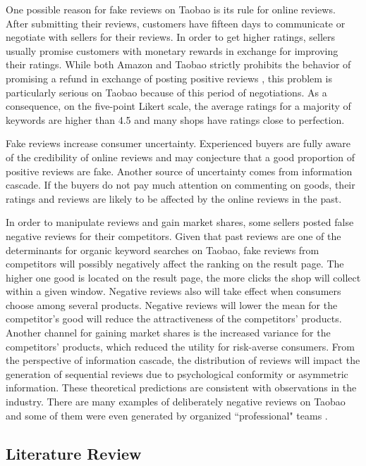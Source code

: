 ﻿\documentclass[a4paper,10pt]{article}
\begin{document}
One possible reason for fake reviews on Taobao is its rule for online reviews. After submitting their reviews, customers have fifteen days to communicate or negotiate with sellers for their reviews. In order to get higher ratings, sellers usually promise customers with monetary rewards in exchange for improving their ratings. While both Amazon and Taobao strictly prohibits the behavior of promising a refund in exchange of posting positive reviews \cite{taobao,amazon}, this problem is particularly serious on Taobao because of this period of negotiations. As a consequence, on the five-point Likert scale, the average ratings for a majority of keywords are higher than 4.5 and many shops have ratings close to perfection. 

Fake reviews increase consumer uncertainty. Experienced buyers are fully aware of the credibility of online reviews and may conjecture that a good proportion of positive reviews are fake. Another source of uncertainty comes from information cascade. If the buyers do not pay much attention on commenting on goods, their ratings and reviews are likely to be affected by the online reviews in the past. 

In order to manipulate reviews and gain market shares, some sellers posted false negative reviews for their competitors. Given that past reviews are one of the determinants for organic keyword searches on Taobao, fake reviews from competitors will possibly negatively affect the ranking on the result page. The higher one good is located on the result page, the more clicks the shop will collect within a given window. Negative reviews also will take effect when consumers choose among several products. Negative reviews will lower the mean for the competitor's good will reduce the attractiveness of the competitors' products. Another channel for gaining market shares is the increased variance for the competitors' products, which reduced the utility for risk-averse consumers. From the perspective of information cascade, the distribution of reviews will impact the generation of sequential reviews due to psychological conformity or asymmetric information. These theoretical predictions are consistent with observations in the industry. There are many examples of deliberately negative reviews on Taobao and some of them were even generated by organized ``professional" teams \cite{sina}.

\subsection{Literature Review} \label{lit}
\end{document}
